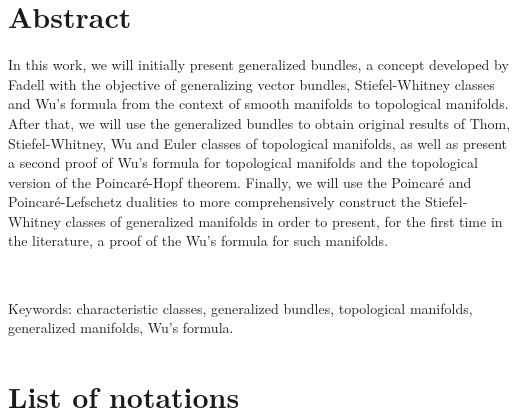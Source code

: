 \documentclass[12pt,oneside]{book}
\begin{document}
\chapter*{Abstract}
\thispagestyle{empty}

In this work, we will initially present generalized bundles, a concept developed by Fadell with the 
objective of generalizing vector bundles, Stiefel-Whitney classes and Wu's formula from the context of 
smooth manifolds to topological manifolds. After that, we will use the generalized bundles to obtain 
original results of Thom, Stiefel-Whitney, Wu and Euler classes of topological manifolds, as well as 
present a second proof of Wu's formula for topological manifolds and the topological version of the 
Poincaré-Hopf theorem. Finally, we will use the Poincaré and Poincaré-Lefschetz dualities to more 
comprehensively construct the Stiefel-Whitney classes of generalized manifolds in order to present, 
for the first time in the literature, a proof of the Wu's formula for such manifolds.

\

\noindent Keywords: characteristic classes, generalized bundles, topological manifolds, generalized 
manifolds, Wu's formula.



\tableofcontents
\thispagestyle{empty}

\listoffigures
\thispagestyle{empty}



\chapter*{List of notations}
\thispagestyle{empty}
\end{document}
